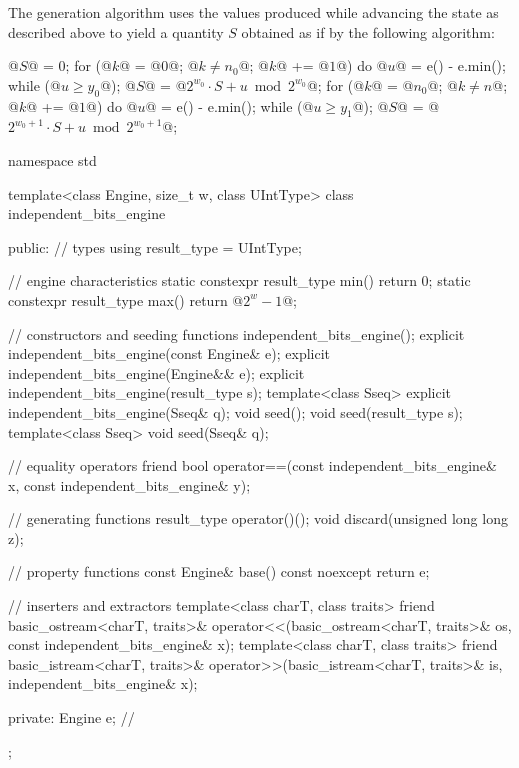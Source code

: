 \pnum
The generation algorithm
uses the values produced
while advancing the state as described above
to yield a quantity $S$
obtained as if by the following algorithm:
\begin{codeblock}
@$S$@ = 0;
for (@$k$@ = @$0$@; @$k \neq n_0$@; @$k$@ += @$1$@)  {
 do @$u$@ = e() - e.min(); while (@$u \ge y_0$@);
 @$S$@ = @$2^{w_0} \cdot S + u \bmod 2^{w_0}$@;
}
for (@$k$@ = @$n_0$@; @$k \neq n$@; @$k$@ += @$1$@)  {
 do @$u$@ = e() - e.min(); while (@$u \ge y_1$@);
 @$S$@ = @$2^{w_0 + 1} \cdot S + u \bmod 2^{w_0 + 1}$@;
}
\end{codeblock}

%
%
\begin{codeblock}
namespace std {
  template<class Engine, size_t w, class UIntType>
  class independent_bits_engine {
  public:
    // types
    using result_type = UIntType;

    // engine characteristics
    static constexpr result_type min() { return 0; }
    static constexpr result_type max() { return @$2^w - 1$@; }

    // constructors and seeding functions
    independent_bits_engine();
    explicit independent_bits_engine(const Engine& e);
    explicit independent_bits_engine(Engine&& e);
    explicit independent_bits_engine(result_type s);
    template<class Sseq> explicit independent_bits_engine(Sseq& q);
    void seed();
    void seed(result_type s);
    template<class Sseq> void seed(Sseq& q);

    // equality operators
    friend bool operator==(const independent_bits_engine& x, const independent_bits_engine& y);

    // generating functions
    result_type operator()();
    void discard(unsigned long long z);

    // property functions
    const Engine& base() const noexcept { return e; }

    // inserters and extractors
    template<class charT, class traits>
      friend basic_ostream<charT, traits>&
        operator<<(basic_ostream<charT, traits>& os, const independent_bits_engine& x);
    template<class charT, class traits>
      friend basic_istream<charT, traits>&
        operator>>(basic_istream<charT, traits>& is, independent_bits_engine& x);

  private:
    Engine e;   // \expos
  };
}
\end{codeblock}%

